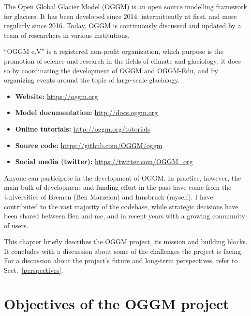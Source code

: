 
The Open Global Glacier Model (OGGM) is an open source modelling framework for glaciers. It has been developed since
2014: intermittently at first, and more regularly since 2016. Today, OGGM is continuously discussed and updated by a
team of researchers in various institutions.

“OGGM e.V” is a registered non-profit organization, which purpose is the promotion of science and research in the fields
of climate and glaciology; it does so by coordinating the development of OGGM and OGGM-Edu, and by organizing events
around the topic of large-scale glaciology.
\begin{itemize}
\item {} 
\textbf{Website:} \href{https://oggm.org}{https://oggm.org}

\item {} 
\textbf{Model documentation:} \href{http://docs.oggm.org}{http://docs.oggm.org}

\item {} 
\textbf{Online tutorials:} \href{http://oggm.org/tutorials}{http://oggm.org/tutorials}

\item {} 
\textbf{Source code:} \href{https://github.com/OGGM/oggm}{https://github.com/OGGM/oggm}

\item {} 
\textbf{Social media (twitter):} \href{https://twitter.com/OGGM\_org}{https://twitter.com/OGGM\_org}

\end{itemize}

Anyone can participate in the development of OGGM. In practice, however, the main bulk of development and funding effort
in the past have come from the Universities of Bremen (Ben Marzeion) and Innsbruck (myself). I have contributed to the
vast majority of the codebase, while strategic decisions have been shared between Ben and me, and in recent years with a
growing community of users.

This chapter briefly describes the OGGM project, its mission and building blocks. It concludes with a discussion about
some of the challenges the project is facing. For a discussion about the project’s future and long-term perspectives,
refer to Sect.~\ref{perspectives}.


\section{Objectives of the OGGM project}


